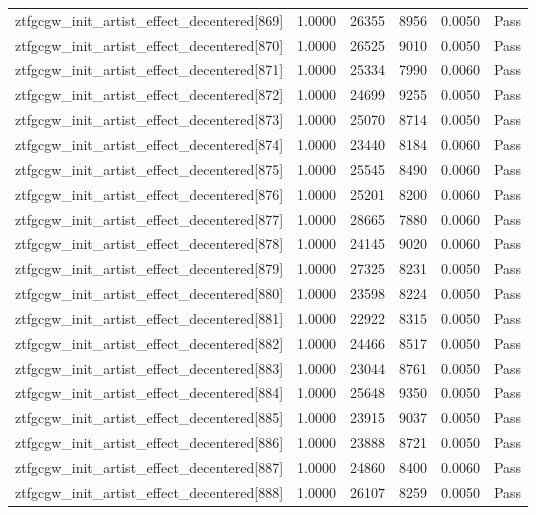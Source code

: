 \begin{table}[htbp]
\begin{tabular}{llrrll}
ztfgcgw\_init\_artist\_effect\_decentered[869] & 1.0000 & 26355 & 8956 & 0.0050 & Pass \\
ztfgcgw\_init\_artist\_effect\_decentered[870] & 1.0000 & 26525 & 9010 & 0.0050 & Pass \\
ztfgcgw\_init\_artist\_effect\_decentered[871] & 1.0000 & 25334 & 7990 & 0.0060 & Pass \\
ztfgcgw\_init\_artist\_effect\_decentered[872] & 1.0000 & 24699 & 9255 & 0.0050 & Pass \\
ztfgcgw\_init\_artist\_effect\_decentered[873] & 1.0000 & 25070 & 8714 & 0.0050 & Pass \\
ztfgcgw\_init\_artist\_effect\_decentered[874] & 1.0000 & 23440 & 8184 & 0.0060 & Pass \\
ztfgcgw\_init\_artist\_effect\_decentered[875] & 1.0000 & 25545 & 8490 & 0.0060 & Pass \\
ztfgcgw\_init\_artist\_effect\_decentered[876] & 1.0000 & 25201 & 8200 & 0.0060 & Pass \\
ztfgcgw\_init\_artist\_effect\_decentered[877] & 1.0000 & 28665 & 7880 & 0.0060 & Pass \\
ztfgcgw\_init\_artist\_effect\_decentered[878] & 1.0000 & 24145 & 9020 & 0.0060 & Pass \\
ztfgcgw\_init\_artist\_effect\_decentered[879] & 1.0000 & 27325 & 8231 & 0.0050 & Pass \\
ztfgcgw\_init\_artist\_effect\_decentered[880] & 1.0000 & 23598 & 8224 & 0.0050 & Pass \\
ztfgcgw\_init\_artist\_effect\_decentered[881] & 1.0000 & 22922 & 8315 & 0.0050 & Pass \\
ztfgcgw\_init\_artist\_effect\_decentered[882] & 1.0000 & 24466 & 8517 & 0.0050 & Pass \\
ztfgcgw\_init\_artist\_effect\_decentered[883] & 1.0000 & 23044 & 8761 & 0.0050 & Pass \\
ztfgcgw\_init\_artist\_effect\_decentered[884] & 1.0000 & 25648 & 9350 & 0.0050 & Pass \\
ztfgcgw\_init\_artist\_effect\_decentered[885] & 1.0000 & 23915 & 9037 & 0.0050 & Pass \\
ztfgcgw\_init\_artist\_effect\_decentered[886] & 1.0000 & 23888 & 8721 & 0.0050 & Pass \\
ztfgcgw\_init\_artist\_effect\_decentered[887] & 1.0000 & 24860 & 8400 & 0.0060 & Pass \\
ztfgcgw\_init\_artist\_effect\_decentered[888] & 1.0000 & 26107 & 8259 & 0.0050 & Pass \\

\end{tabular}
\end{table}
